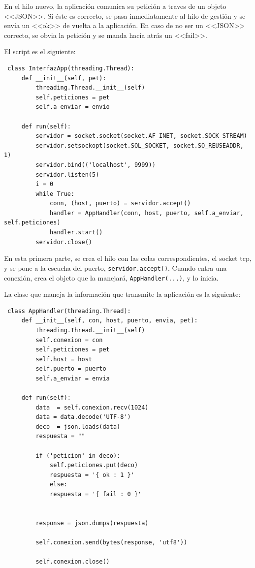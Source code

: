  En el hilo nuevo, la aplicación comunica su petición a traves de un objeto <<JSON>>. Si éste es correcto, se pasa inmediatamente al hilo de gestión y se envía un <<ok>> de vuelta a la aplicación. En caso de no ser un <<JSON>> correcto, se obvia la petición y se manda hacia atrás un <<fail>>.
 
 El script es el siguiente:
 \begin{lstlisting}
 class InterfazApp(threading.Thread):
     def __init__(self, pet):
         threading.Thread.__init__(self)
         self.peticiones = pet
         self.a_enviar = envio
 
     def run(self):
         servidor = socket.socket(socket.AF_INET, socket.SOCK_STREAM)
         servidor.setsockopt(socket.SOL_SOCKET, socket.SO_REUSEADDR, 1)
         servidor.bind(('localhost', 9999))
         servidor.listen(5)
         i = 0
         while True:
             conn, (host, puerto) = servidor.accept()
             handler = AppHandler(conn, host, puerto, self.a_enviar, self.peticiones)
             handler.start()
         servidor.close()
 \end{lstlisting}
 
 En esta primera parte, se crea el hilo con las colas correspondientes, el socket tcp, y se pone a la escucha del puerto, \lstinline|servidor.accept()|. Cuando entra una conexión, crea el objeto que la manejará, \lstinline|AppHandler(...)|, y lo inicia.
 
 La clase que maneja la información que transmite la aplicación es la siguiente:
 \begin{lstlisting}
 class AppHandler(threading.Thread):
     def __init__(self, con, host, puerto, envia, pet):
         threading.Thread.__init__(self)
         self.conexion = con
         self.peticiones = pet
         self.host = host
         self.puerto = puerto
         self.a_enviar = envia
 
     def run(self):
         data  = self.conexion.recv(1024)
         data = data.decode('UTF-8')
         deco  = json.loads(data)
         respuesta = ""
 
         if ('peticion' in deco):
             self.peticiones.put(deco)
             respuesta = '{ ok : 1 }'
             else:
             respuesta = '{ fail : 0 }'
 
 
         response = json.dumps(respuesta)
 
         self.conexion.send(bytes(response, 'utf8'))
 
         self.conexion.close()
 \end{lstlisting}
 
